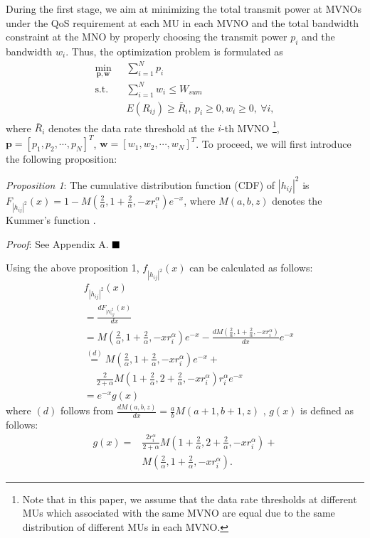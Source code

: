 \documentclass[journal]{IEEEtran}
\begin{document}
During the first stage, we aim at minimizing the total transmit power at MVNOs under the QoS requirement at each MU in each MVNO and the total bandwidth constraint at the MNO by properly choosing the transmit power $p_i$ and the bandwidth $w_i$. Thus, the optimization problem is formulated as
\begin{subequations}\label{q4}
	\begin{align}
	\min_{\mathbf{p}, \mathbf{w}}\ & \sum\limits_{i = 1}^{N} p_i \\ \mbox{s.t.} \quad &  \sum\limits_{i = 1}^{N} w_i \leq W_{sum}\\ \quad &  E\left({R}_{ij}\right) \geq \bar{R}_i, \ p_i \geq 0, w_i \geq 0, \ \forall i, 
	\end{align}
\end{subequations}
where $\bar{R}_i$ denotes the data rate threshold at the $i$-th MVNO  \footnote{Note that in this paper, we assume that the data rate thresholds at different MUs which associated with the same MVNO are equal due to the same distribution of different MUs in each MVNO.}, $\mathbf{p} = \left[p_1, p_2, \cdots, p_N\right]^T$, $\mathbf{w} = \left[w_1, w_2, \cdots, w_N\right]^T$. To proceed, we will first introduce the following proposition:

\textit{Proposition 1}: The cumulative distribution function (CDF) of $\left|h_{ij} \right|^2$ is $F_{\left|h_{ij} \right|^2}\left(x\right) = 1 - M\left(\frac{2}{\alpha}, 1 + \frac{2}{\alpha}, - x r_i^{\alpha}\right)e^{-x}$, where $M\left(a,b,z\right)$ denotes the Kummer's function \cite{MAbramowitz}.


\textit{Proof}: See Appendix A.  $\hfill\blacksquare$

Using the above proposition 1, $f_{\left|h_{ij} \right|^2} \left(x\right)$ can be calculated as follows:
\begin{align}
&f_{\left|h_{ij} \right|^2} \left(x\right)\nonumber \\ &= \frac{d F_{\left|h\right|_{ij}^2}\left(x\right)}{d x} \nonumber \\
&=M\left(\frac{2}{\alpha}, 1 + \frac{2}{\alpha}, -xr_i^{\alpha}\right)e^{-x} -\frac{d M\left(\frac{2}{\alpha}, 1 + \frac{2}{\alpha}, -x r_i^{\alpha}\right)}{d x} e^{-x} \nonumber \\
&\overset{\left(d\right)}{=} M\left(\frac{2}{\alpha}, 1 + \frac{2}{\alpha}, -xr_i^{\alpha}\right)e^{-x} + \nonumber \\ & \quad \ \frac{2}{2+\alpha}M\left(1 + \frac{2}{\alpha}, 2+\frac{2}{\alpha}, -xr_i^{\alpha}\right)r_i^{\alpha}e^{-x} \nonumber \\
& = e^{-x}g\left(x\right)
\end{align}
where $\left(d\right)$ follows from $\frac{d M\left(a, b, z\right)}{d x} = \frac{a}{b}M\left(a+1, b+1, z\right)$ \cite[13.4.8]{MAbramowitz}, $g\left(x\right)$ is defined as follows:
\begin{align}
g\left(x\right) =& \frac{2r_i^{\alpha}}{2+\alpha} M\left(1 + \frac{2}{\alpha}, 2+ \frac{2}{\alpha}, -xr_i^{\alpha}\right) + \nonumber \\ & M\left(\frac{2}{\alpha}, 1 + \frac{2}{\alpha}, -xr_i^{\alpha}\right).
\end{align}
\end{document}
